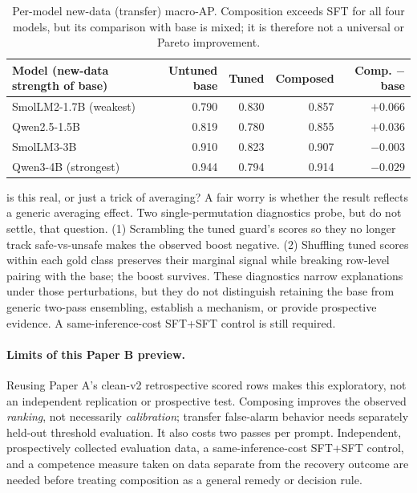 \documentclass[11pt]{article}
\begin{document}
\begin{table}[t]
\centering\small
\caption{Per-model new-data (transfer) macro-AP. Composition exceeds SFT for all four models,
but its comparison with base is mixed; it is therefore not a universal or Pareto improvement.}
\label{tab:composeperm}
\begin{tabular}{lrrrr}
\toprule
Model (new-data strength of base) & Untuned base & Tuned & Composed & Comp. $-$ base \\
\midrule
SmolLM2-1.7B (weakest) & 0.790 & 0.830 & 0.857 & $+0.066$ \\
Qwen2.5-1.5B & 0.819 & 0.780 & 0.855 & $+0.036$ \\
SmolLM3-3B & 0.910 & 0.823 & 0.907 & $-0.003$ \\
Qwen3-4B (strongest) & 0.944 & 0.794 & 0.914 & $-0.029$ \\
\bottomrule
\end{tabular}
\end{table}

\begin{background}{is this real, or just a trick of averaging?}
\small
A fair worry is whether the result reflects a generic averaging effect. Two single-permutation
diagnostics probe, but do not settle, that question. (1) Scrambling the tuned guard's scores so
they no longer track safe-vs-unsafe makes the observed boost negative. (2) Shuffling tuned scores
within each gold class preserves their marginal signal while breaking row-level pairing with the
base; the boost survives. These diagnostics narrow explanations under those perturbations, but
they do not distinguish retaining the base from generic two-pass ensembling, establish a
mechanism, or provide prospective evidence. A same-inference-cost SFT+SFT control is still required.
\end{background}

\paragraph{Limits of this Paper B preview.} Reusing Paper A's clean-v2 retrospective scored rows makes
this exploratory, not an independent replication or prospective test. Composing improves the
observed \emph{ranking}, not necessarily \emph{calibration}; transfer false-alarm behavior needs
separately held-out threshold evaluation. It also costs two passes per prompt. Independent,
prospectively collected evaluation data, a same-inference-cost SFT+SFT control, and a competence
measure taken on data separate from the recovery outcome are needed before treating composition
as a general remedy or decision rule.
\end{document}
